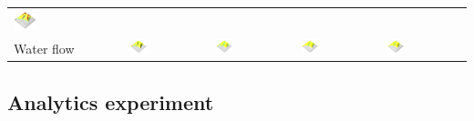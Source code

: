 \documentclass[prodmode,acmtochi]{acmsmall} %
\begin{document}
\begin{table}
{\begin{tabular}{m{} m{} m{} m{} m{}}
\includegraphics[width=0.22\textwidth]{images/render_3d/mean_forms_3.png}\\
%
Water flow &
\includegraphics[width=0.22\textwidth]{images/render_3d/depth_1.png} &
\includegraphics[width=0.22\textwidth]{images/render_3d/mean_depth_1.png} &
\includegraphics[width=0.22\textwidth]{images/render_3d/mean_depth_2.png} &
\includegraphics[width=0.22\textwidth]{images/render_3d/mean_depth_3.png}\\
%
\bottomrule
\end{tabular}}
\label{table:coupling_experiment} 
\end{table}


\subsection{Analytics experiment}
\end{document}
